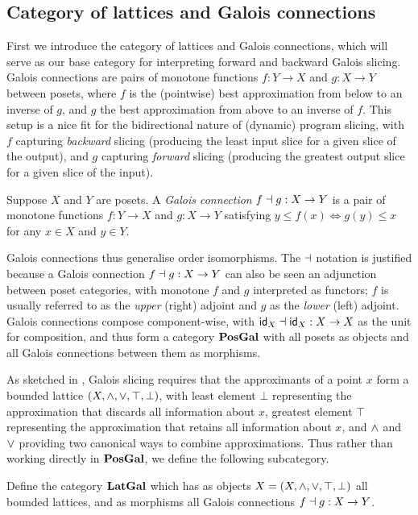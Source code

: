 \subsection{Category of lattices and Galois connections}

First we introduce the category of lattices and Galois connections, which will serve as our base category for
interpreting forward and backward Galois slicing. Galois connections are pairs of monotone functions $f: Y \to
X$ and $g: X \to Y$ between posets, where $f$ is the (pointwise) best approximation from below to an inverse
of $g$, and $g$ the best approximation from above to an inverse of $f$. This setup is a nice fit for the
bidirectional nature of (dynamic) program slicing, with $f$ capturing \emph{backward} slicing (producing the
least input slice for a given slice of the output), and $g$ capturing \emph{forward} slicing (producing the
greatest output slice for a given slice of the input).

\begin{definition}
Suppose $X$ and $Y$ are posets. A \emph{Galois connection} $f \dashv g: X \to Y$ is a pair of monotone functions
$f: Y \to X$ and $g: X \to Y$ satisfying $y \leq f(x) \iff g(y) \leq x$ for any $x \in X$ and $y \in Y$.
\end{definition}

\noindent Galois connections thus generalise order isomorphisms. The $\dashv$ notation is justified because a
Galois connection $f \dashv g: X \to Y$ can also be seen an adjunction between poset categories, with monotone
$f$ and $g$ interpreted as functors; $f$ is usually referred to as the \emph{upper} (right) adjoint and $g$ as
the \emph{lower} (left) adjoint. Galois connections compose component-wise, with $\mathsf{id}_X \dashv \mathsf{id}_X: X \to X$
as the unit for composition, and thus form a category $\mathbf{PosGal}$ with all posets as objects and all Galois
connections between them as morphisms.

As sketched in , Galois slicing requires that the approximants of a point
$x$ form a bounded lattice $(X, \wedge, \vee, \top, \bot)$, with least element $\bot$ representing the
approximation that discards all information about $x$, greatest element $\top$ representing the approximation
that retains all information about $x$, and $\wedge$ and $\vee$ providing two canonical ways to combine
approximations. Thus rather than working directly in $\mathbf{PosGal}$, we define the following subcategory.

\begin{definition}
Define the category $\mathbf{LatGal}$ which has as objects $X = (X, \wedge, \vee, \top, \bot)$ all bounded lattices,
and as morphisms all Galois connections $f \dashv g: X \to Y$.
\end{definition}

